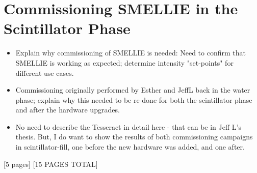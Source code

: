{\section[Commissioning SMELLIE in the Scintillator Phase]{Commissioning SMELLIE in the\\ Scintillator Phase}
\begin{itemize}
    \item Explain why commissioning of SMELLIE is needed: Need to confirm that SMELLIE is working as expected; determine intensity "set-points" for different use cases.
    \item Commissioning originally performed by Esther and JeffL back in the water phase; explain why this needed to be re-done for both the scintillator phase and after the hardware upgrades.
    \item No need to describe the Tesseract in detail here - that can be in Jeff L's thesis. But, I do want to show the results of both commissioning campaigns in scintillator-fill, one before the new hardware was added, and one after.
\end{itemize}
[5 pages]
[15 PAGES TOTAL]
}